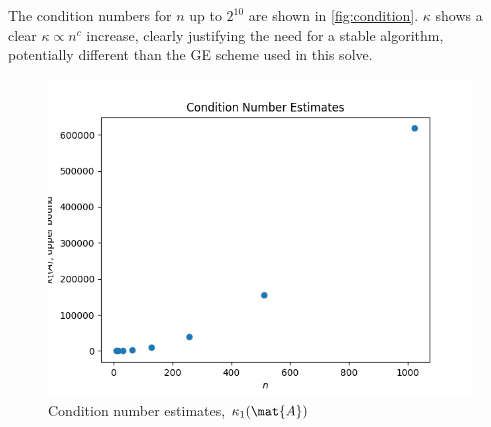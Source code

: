 \documentclass{template}
\begin{document}
The condition numbers for $n$ up to $2^{10}$ are shown in \autoref{fig:condition}. $\kappa$ shows a clear $\kappa \propto n^c$ increase, clearly justifying the need for a stable algorithm, potentially different than the GE scheme used in this solve.

\begin{figure}
    \centering
    \includegraphics[width=0.65\linewidth]{condition_linear.png}
    \caption{Condition number estimates, $\kappa_1(\mat{A})$}
    \label{fig:condition}
\end{figure}
\end{document}
